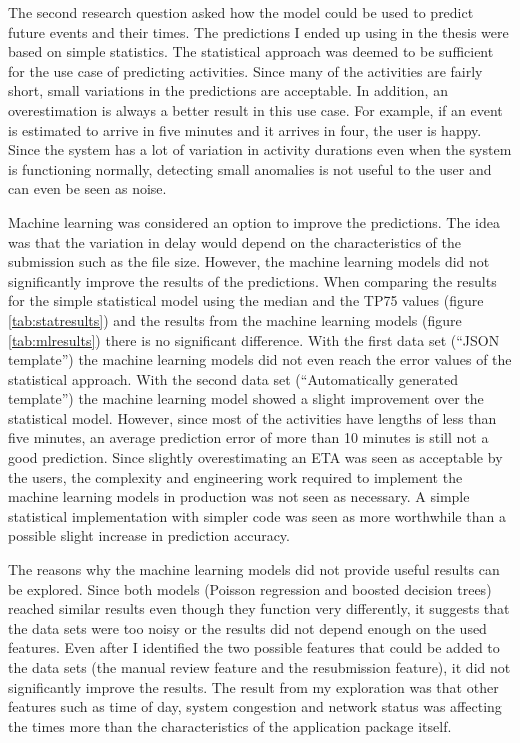 The second research question asked how the model could be used to predict future events and their times. 
The predictions I ended up using in the thesis were based on simple statistics. 
The statistical approach was deemed to be sufficient for the use case of predicting activities. 
Since many of the activities are fairly short, small variations in the predictions are acceptable. 
In addition, an overestimation is always a better result in this use case.
For example, if an event is estimated to arrive in five minutes and it arrives in four, the user is happy.
Since the system has a lot of variation in activity durations even when the system is functioning normally, detecting small anomalies is not useful to the user and can even be seen as noise.

Machine learning was considered an option to improve the predictions. The idea was that the variation in delay would depend on the characteristics of the submission such as the file size.
However, the machine learning models did not significantly improve the results of the predictions.
When comparing the results for the simple statistical model using the median and the TP75 values (figure \ref{tab:statresults}) and the results from the machine learning models (figure \ref{tab:mlresults}) there is no significant difference.
With the first data set (``JSON template'') the machine learning models did not even reach the error values of the statistical approach.
With the second data set (``Automatically generated template'') the machine learning model showed a slight improvement over the statistical model.
However, since most of the activities have lengths of less than five minutes, an average prediction error of more than 10 minutes is still not a good prediction.
Since slightly overestimating an ETA was seen as acceptable by the users, the complexity and engineering work required to implement the machine learning models in production was not seen as necessary.
A simple statistical implementation with simpler code was seen as more worthwhile than a possible slight increase in prediction accuracy.


The reasons why the machine learning models did not provide useful results can be explored.
Since both models (Poisson regression and boosted decision trees) reached similar results even though they function very differently, it suggests that the data sets were too noisy or the results did not depend enough on the used features.
Even after I identified the two possible features that could be added to the data sets (the manual review feature and the resubmission feature), it did not significantly improve the results.
The result from my exploration was that other features such as time of day, system congestion and network status was affecting the times more than the characteristics of the application package itself.

